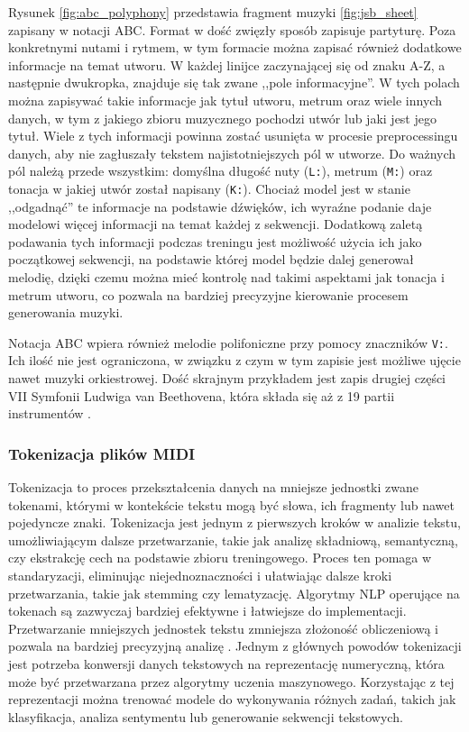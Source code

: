 \documentclass[data-science]{agh-wi} %
\begin{document}
Rysunek \ref*{fig:abc_polyphony} przedstawia fragment muzyki \ref*{fig:jsb_sheet} zapisany w notacji ABC. Format w dość zwięzły sposób zapisuje partyturę. Poza konkretnymi nutami i rytmem, w tym formacie można zapisać również dodatkowe informacje na temat utworu. W każdej linijce zaczynającej się od znaku A-Z, a następnie dwukropka, znajduje się tak zwane ,,pole informacyjne''. W tych polach można zapisywać takie informacje jak tytuł utworu, metrum oraz wiele innych danych, w tym z jakiego zbioru muzycznego pochodzi utwór lub jaki jest jego tytuł. Wiele z tych informacji powinna zostać usunięta w procesie preprocessingu danych, aby nie zagłuszały tekstem najistotniejszych pól w utworze. Do ważnych pól należą przede wszystkim: domyślna długość nuty (\texttt{L:}), metrum (\texttt{M:}) oraz tonacja w jakiej utwór został napisany (\texttt{K:}). Chociaż model jest w stanie ,,odgadnąć'' te informacje na podstawie dźwięków, ich wyraźne podanie daje modelowi więcej informacji na temat każdej z sekwencji. Dodatkową zaletą podawania tych informacji podczas treningu jest możliwość użycia ich jako początkowej sekwencji, na podstawie której model będzie dalej generował melodię, dzięki czemu można mieć kontrolę nad takimi aspektami jak tonacja i metrum utworu, co pozwala na bardziej precyzyjne kierowanie procesem generowania muzyki.

Notacja ABC wpiera również melodie polifoniczne przy pomocy znaczników \texttt{V:}. Ich ilość nie jest ograniczona, w związku z czym w tym zapisie jest możliwe ujęcie nawet muzyki orkiestrowej. Dość skrajnym przykładem jest zapis drugiej części VII Symfonii Ludwiga van Beethovena, która składa się aż z 19 partii instrumentów \cite{beethoven}.

\subsubsection*{Tokenizacja plików MIDI}\label{sec:REMI}
Tokenizacja to proces przekształcenia danych na mniejsze jednostki zwane tokenami, którymi w kontekście tekstu mogą być słowa, ich fragmenty lub nawet pojedyncze znaki. Tokenizacja jest jednym z pierwszych kroków w analizie tekstu, umożliwiającym dalsze przetwarzanie, takie jak analizę składniową, semantyczną, czy ekstrakcję cech na podstawie zbioru treningowego. Proces ten pomaga w standaryzacji, eliminując niejednoznaczności i ułatwiając dalsze kroki przetwarzania, takie jak stemming czy lematyzację. Algorytmy NLP operujące na tokenach są zazwyczaj bardziej efektywne i łatwiejsze do implementacji. Przetwarzanie mniejszych jednostek tekstu zmniejsza złożoność obliczeniową i pozwala na bardziej precyzyjną analizę \cite*{tokenizacja}. Jednym z głównych powodów tokenizacji jest potrzeba konwersji danych tekstowych na reprezentację numeryczną, która może być przetwarzana przez algorytmy uczenia maszynowego. Korzystając z tej reprezentacji można trenować modele do wykonywania różnych zadań, takich jak klasyfikacja, analiza sentymentu lub generowanie sekwencji tekstowych.
\end{document}
